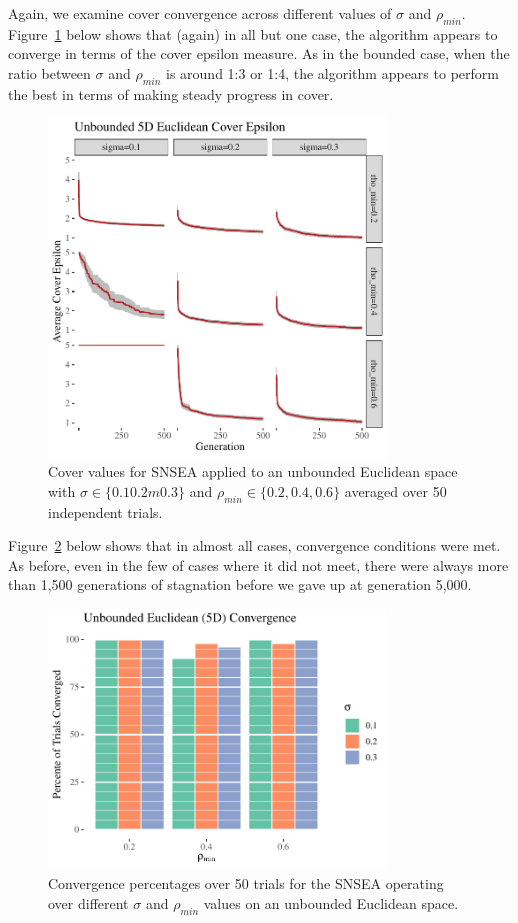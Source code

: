 \documentclass[twoside]{article}
\begin{document}
Again, we examine cover convergence across different values of $\sigma$ and $\rho_{min}$.  Figure~\ref{fig:unbounded:nopop:sm} below shows that (again) in all but one case, the algorithm appears to converge in terms of the cover epsilon measure.  As in the bounded case, when the ratio between $\sigma$ and $\rho_{min}$ is around 1:3 or 1:4, the algorithm appears to perform the best in terms of making steady progress in cover.  
%
\begin{figure}[t]
  \center\includegraphics[width=0.8\textwidth]{Figures/unbounded-500sm-NOPOP.pdf}
  \caption{\label{fig:unbounded:nopop:sm} Cover values for SNSEA applied to an unbounded Euclidean space with $\sigma\in\{0.1  0.2m 0.3\}$ and $\rho_{min} \in \{0.2, 0.4, 0.6\}$ averaged over 50 independent trials.}
\end{figure}
%
Figure~\ref{fig:bounded:nopop:conv} below shows that in almost all cases, convergence conditions were met.  As before, even in the few of cases where it did not meet, there were always more than 1,500 generations of stagnation before we gave up at generation 5,000.  
%
\begin{figure}[t]
  \center\includegraphics[width=0.8\textwidth]{Figures/unbounded-conv-NOPOP.pdf}
  \caption{\label{fig:bounded:nopop:conv} Convergence percentages over 50 trials for the SNSEA operating over different $\sigma$ and $\rho_{min}$ values on an unbounded Euclidean space.}
\end{figure}
%
\end{document}
